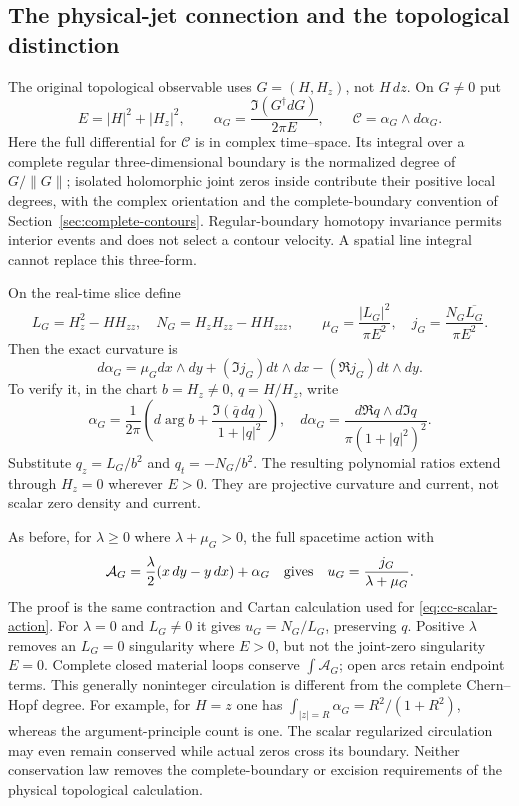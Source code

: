 \subsection{The physical-jet connection and the topological distinction}

The original topological observable uses $G=(H,H_z)$, not $H\,dz$.
On $G\ne0$ put
\begin{equation}
 E=|H|^2+|H_z|^2,\qquad
 \alpha_G=\frac{\Im(G^\dagger dG)}{2\pi E},\qquad
 \mathcal C=\alpha_G\wedge d\alpha_G.
 \label{eq:cc-jet-connection}
\end{equation}
Here the full differential for $\mathcal C$ is in complex time--space.
Its integral over a complete regular three-dimensional boundary is the
normalized degree of $G/\|G\|$; isolated holomorphic joint zeros inside
contribute their positive local degrees, with the complex orientation
and the complete-boundary convention of
Section~\ref{sec:complete-contours}.  Regular-boundary homotopy
invariance permits interior events and does not select a contour
velocity.  A spatial line integral cannot replace this three-form.

On the real-time slice define
\[
 L_G=H_z^2-HH_{zz},\quad N_G=H_zH_{zz}-HH_{zzz},\qquad
 \mu_G=\frac{|L_G|^2}{\pi E^2},\quad
 j_G=\frac{N_G\overline{L_G}}{\pi E^2}.
\]
Then the exact curvature is
\begin{equation}
 d\alpha_G=\mu_Gdx\wedge dy+
             (\Im j_G)dt\wedge dx-(\Re j_G)dt\wedge dy.
 \label{eq:cc-jet-curvature}
\end{equation}
To verify it, in the chart $b=H_z\ne0$, $q=H/H_z$, write
\[
 \alpha_G=\frac1{2\pi}\left(d\arg b+
             \frac{\Im(\overline q\,dq)}{1+|q|^2}\right),\quad
 d\alpha_G=\frac{d\Re q\wedge d\Im q}{\pi(1+|q|^2)^2}.
\]
Substitute $q_z=L_G/b^2$ and $q_t=-N_G/b^2$.
The resulting polynomial ratios extend through $H_z=0$ wherever
$E>0$.  They are projective curvature and current, not scalar zero
density and current.

As before, for $\lambda\ge0$ where $\lambda+\mu_G>0$, the full
spacetime action with
\begin{equation}
 \mathcal A_G=\frac\lambda2(x\,dy-y\,dx)+\alpha_G
 \quad\hbox{gives}\quad
 u_G=\frac{j_G}{\lambda+\mu_G}.
 \label{eq:cc-jet-action}
\end{equation}
The proof is the same contraction and Cartan calculation used for
\eqref{eq:cc-scalar-action}.  For $\lambda=0$ and $L_G\ne0$ it gives
$u_G=N_G/L_G$, preserving $q$.  Positive $\lambda$ removes an
$L_G=0$ singularity where $E>0$, but not the joint-zero singularity
$E=0$.  Complete closed material loops conserve $\int\mathcal A_G$;
open arcs retain endpoint terms.  This generally noninteger circulation
is different from the complete Chern--Hopf degree.  For example, for
$H=z$ one has $\int_{|z|=R}\alpha_G=R^2/(1+R^2)$, whereas the
argument-principle count is one.  The scalar regularized circulation
may even remain conserved while actual zeros cross its boundary.
Neither conservation law removes the complete-boundary or excision
requirements of the physical topological calculation.


